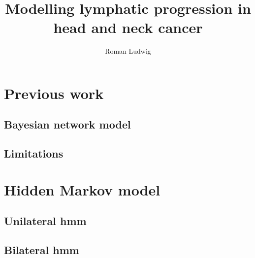 \documentclass[hyperpdf,bindnopdf]{hepthesis}
\title{Modelling lymphatic progression in head and neck cancer}
\author{Roman Ludwig}
\begin{document}
%     

\begin{mainmatter}
    
    \chapter{Previous work}
    \label{chap:previous_work}
    
    
        \section{Bayesian network model}
        \label{sec:bn_model}
        
        
        \section{Limitations}
        \label{sec:limitations}
        
    
    \chapter{Hidden Markov model}
    \label{chap:hmm_model}
    
        
        \section{Unilateral \gls{hmm}}
        \label{sec:hmm_unilateral}
        
        
        \section{Bilateral \gls{hmm}}
        \label{sec:hmm_bilateral}
        
\end{mainmatter}

%     

\begin{backmatter}
    
\end{backmatter}

\end{document}
